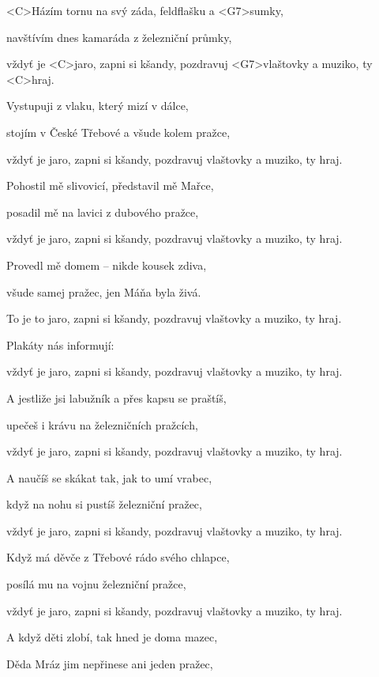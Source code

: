 

\zs
<C>Házím tornu na svý záda, feldflašku a <G7>sumky,

navštívím dnes kamaráda z železniční průmky,

vždyť je <C>jaro, zapni si kšandy,
pozdravuj <G7>vlaštovky a muziko, ty <C>hraj.
\ks

\zs
Vystupuji z vlaku, který mizí v dálce,

stojím v České Třebové a všude kolem pražce,

vždyť je jaro, zapni si kšandy,
pozdravuj vlaštovky a muziko, ty hraj.
\ks

\zs
Pohostil mě slivovicí, představil mě Mařce,

posadil mě na lavici z dubového pražce,

vždyť je jaro, zapni si kšandy,
pozdravuj vlaštovky a muziko, ty hraj.
\ks

\zs
Provedl mě domem -- nikde kousek zdiva,

všude samej pražec, jen Máňa byla živá.

To je to jaro, zapni si kšandy,
pozdravuj vlaštovky a muziko, ty hraj.
\ks

\zs
Plakáty nás informují: 

vždyť je jaro, zapni si kšandy,
pozdravuj vlaštovky a muziko, ty hraj.
\ks

\zs
A jestliže jsi labužník a přes kapsu se praštíš,

upečeš i krávu na železničních pražcích,

vždyť je jaro, zapni si kšandy,
pozdravuj vlaštovky a muziko, ty hraj.
\ks

\zs
A naučíš se skákat tak, jak to umí vrabec,

když na nohu si pustíš železniční pražec,

vždyť je jaro, zapni si kšandy,
pozdravuj vlaštovky a muziko, ty hraj.
\ks

\zs
Když má děvče z Třebové rádo svého chlapce,

posílá mu na vojnu železniční pražce,

vždyť je jaro, zapni si kšandy,
pozdravuj vlaštovky a muziko, ty hraj.
\ks

\zs
A když děti zlobí, tak hned je doma mazec,

Děda Mráz jim nepřinese ani jeden pražec,

